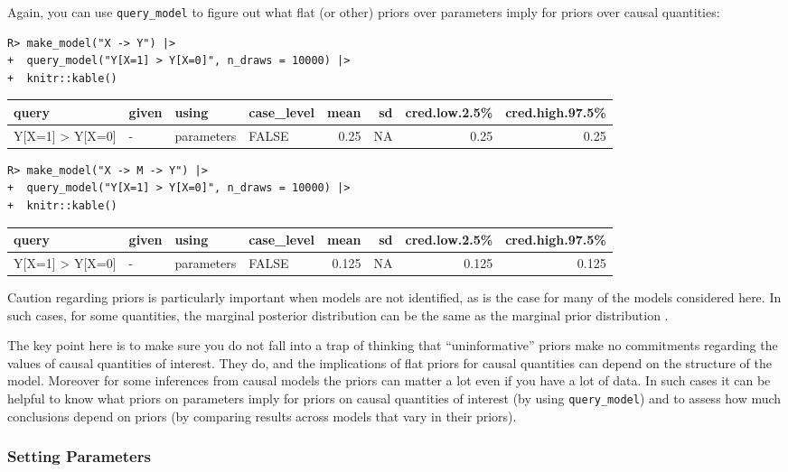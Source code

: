 \documentclass[
  11pt,
  article]{jss}
\begin{document}
Again, you can use \texttt{query\_model} to figure out what flat (or
other) priors over parameters imply for priors over causal quantities:

\begin{verbatim}
R> make_model("X -> Y") |>
+  query_model("Y[X=1] > Y[X=0]", n_draws = 10000) |>
+  knitr::kable()
\end{verbatim}

\begin{tabular}{l|l|l|l|r|r|r|r}
\hline
query & given & using & case\_level & mean & sd & cred.low.2.5\% & cred.high.97.5\%\\
\hline
Y[X=1] > Y[X=0] & - & parameters & FALSE & 0.25 & NA & 0.25 & 0.25\\
\hline
\end{tabular}

\begin{verbatim}
R> make_model("X -> M -> Y") |>
+  query_model("Y[X=1] > Y[X=0]", n_draws = 10000) |>
+  knitr::kable()
\end{verbatim}

\begin{tabular}{l|l|l|l|r|r|r|r}
\hline
query & given & using & case\_level & mean & sd & cred.low.2.5\% & cred.high.97.5\%\\
\hline
Y[X=1] > Y[X=0] & - & parameters & FALSE & 0.125 & NA & 0.125 & 0.125\\
\hline
\end{tabular}

Caution regarding priors is particularly important when models are not
identified, as is the case for many of the models considered here. In
such cases, for some quantities, the marginal posterior distribution can
be the same as the marginal prior distribution
\citep{poirier1998revising}.

The key point here is to make sure you do not fall into a trap of
thinking that ``uninformative'' priors make no commitments regarding the
values of causal quantities of interest. They do, and the implications
of flat priors for causal quantities can depend on the structure of the
model. Moreover for some inferences from causal models the priors can
matter a lot even if you have a lot of data. In such cases it can be
helpful to know what priors on parameters imply for priors on causal
quantities of interest (by using \texttt{query\_model}) and to assess
how much conclusions depend on priors (by comparing results across
models that vary in their priors).

\hypertarget{parameters}{%
\subsubsection{Setting Parameters}\label{parameters}}
\end{document}
